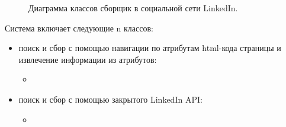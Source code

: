 \begin{figure}[H]
    \caption{Диаграмма классов сборщик в социальной сети LinkedIn.}
    \label{ris:image}
\end{figure}

Система включает следующие n классов:
\begin{itemize}
    \item поиск и сбор с помощью навигации по атрибутам html-кода страницы и извлечение информации из атрибутов:
    \begin{itemize}
        \item 
    \end{itemize}
    \item поиск и сбор с помощью закрытого LinkedIn API:
    \begin{itemize}
        \item 
    \end{itemize}  
\end{itemize}
